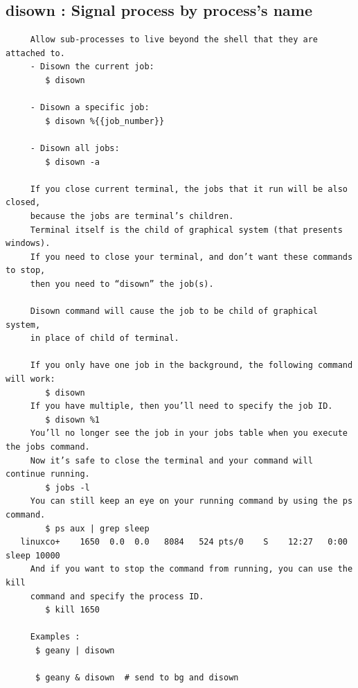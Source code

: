 \documentclass[a4paper,12pt]{article}
\begin{document}
\subsection{disown     : Signal process by process's name }
\begin{verbatim}
     Allow sub-processes to live beyond the shell that they are attached to.
     - Disown the current job:
        $ disown

     - Disown a specific job:
        $ disown %{{job_number}}

     - Disown all jobs:
        $ disown -a
        
     If you close current terminal, the jobs that it run will be also closed,
     because the jobs are terminal’s children.
     Terminal itself is the child of graphical system (that presents windows).
     If you need to close your terminal, and don’t want these commands to stop,
     then you need to “disown” the job(s). 

     Disown command will cause the job to be child of graphical system,
     in place of child of terminal. 

     If you only have one job in the background, the following command will work:
        $ disown
     If you have multiple, then you’ll need to specify the job ID.
        $ disown %1
     You’ll no longer see the job in your jobs table when you execute the jobs command.
     Now it’s safe to close the terminal and your command will continue running.
        $ jobs -l
     You can still keep an eye on your running command by using the ps command.
        $ ps aux | grep sleep
   linuxco+    1650  0.0  0.0   8084   524 pts/0    S    12:27   0:00 sleep 10000
     And if you want to stop the command from running, you can use the kill
     command and specify the process ID.
        $ kill 1650        
     
     Examples : 
      $ geany | disown     
     
      $ geany & disown  # send to bg and disown 
     
\end{verbatim}
\end{document}
